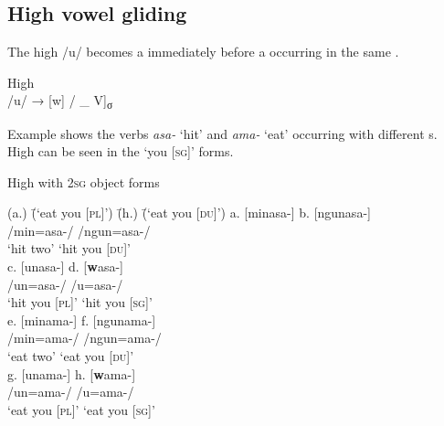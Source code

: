 \subsection{High vowel gliding}\label{sec:2.5.3}


The high  /u/ becomes a  immediately before a  occurring in the same  .

\ea%
    \label{ex:phon:67}
          High  \\
    /u/ → [w] / \_ V]{\textsubscript{σ}}
\z

Example  shows the verbs \textit{asa-} ‘hit’ and \textit{ama-} ‘eat’ occurring with different  s. High   can be seen in the ‘you [\textsc{sg]}’ forms.

\newpage

\ea%
    \label{ex:phon:68}
          High   with 2\textsc{sg} object forms\\
\begin{tabbing}    
{(a.)} \= {(‘eat you [\textsc{pl}]’)} \= {(h.)} \= {(‘eat you [\textsc{du}]’)}\kill
{a.} \> {[minasa-]} \> {b.} \> {[ngunasa-]}\\
{ } \> {/min=asa-/} \> { } \> {/ngun=asa-/}\\
{ } \> {‘hit two’} \> { } \> {‘hit you [\textsc{du}]’}\\
{c.} \> {[unasa-]} \> {d.} \> {[\textbf{w}asa-]}\\
{ } \> {/un=asa-/} \> { } \> {/u=asa-/}\\
{ } \> {‘hit you [\textsc{pl}]’} \> { } \> {‘hit you [\textsc{sg}]’}\\
{e.} \> {[minama-]} \> {f.} \> {[ngunama-]}\\
{ } \> {/min=ama-/} \> { } \> {/ngun=ama-/}\\
{ } \> {‘eat two’} \> { } \> {‘eat you [\textsc{du}]’}\\
{g.} \> {[unama-]} \> {h.} \> {[\textbf{w}ama-]}\\
{ } \> {/un=ama-/} \> { } \> {/u=ama-/}\\
{ } \> {‘eat you [\textsc{pl}]’} \> { } \> {‘eat you [\textsc{sg}]’}
\end{tabbing}
\z

